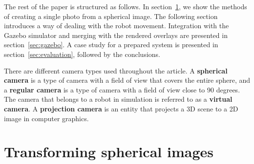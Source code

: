 \documentclass{svproc}
\begin{document}
The rest of the paper is structured as follows. In section~\ref{sec:spherical}, we show the methods of creating
a single photo from a spherical image. The following section introduces a way of dealing with the robot movement.
Integration with the Gazebo simulator and merging with the rendered overlays are presented in section~\ref{sec:gazebo}.
A case study for a prepared system is presented in section~\ref{sec:evaluation}, followed by the conclusions.






There are different camera types used throughout the article. A \textbf{spherical camera} is a type of camera with a field of view that covers the entire sphere, and a \textbf{regular camera} is a type of camera with a field of view close to $90$ degrees.
The camera that belongs to a robot in simulation is referred to as a \textbf{virtual camera}.
A \textbf{projection camera} is an entity that projects a 3D scene to a 2D image in computer graphics.


\section{Transforming spherical images}
\label{sec:spherical}
\end{document}
